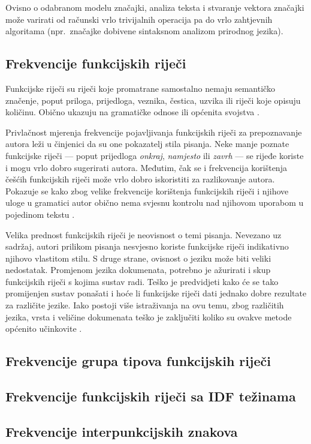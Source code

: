 \documentclass{article}
\begin{document}
Ovisno o odabranom modelu značajki, analiza teksta i stvaranje vektora značajki
može varirati od računski vrlo trivijalnih operacija pa do vrlo zahtjevnih
algoritama (npr.~značajke dobivene sintaksnom analizom prirodnog jezika).


\subsection{Frekvencije funkcijskih riječi}
Funkcijske riječi su riječi koje promatrane samostalno nemaju semantičko
značenje, poput priloga, prijedloga, veznika, čestica, uzvika ili riječi koje
opisuju količinu. Obično ukazuju na gramatičke odnose ili općenita svojstva
\citep{zhao2005effective}.

Privlačnost mjerenja frekvencije pojavljivanja funkcijskih riječi za
prepoznavanje autora leži u činjenici da su one pokazatelj stila pisanja. Neke
manje poznate funkcijske riječi --- poput prijedloga \emph{onkraj},
\emph{namjesto} ili \emph{zavrh} --- se rijeđe koriste i mogu vrlo dobro
sugerirati autora. Međutim, čak se i frekvencija korištenja češćih funkcijskih
riječi može vrlo dobro iskoristiti za razlikovanje autora. Pokazuje se kako zbog
velike frekvencije korištenja funkcijskih riječi i njihove uloge u gramatici
autor obično nema svjesnu kontrolu nad njihovom uporabom u pojedinom tekstu
\citep{argamon2005measuring}.

Velika prednost funkcijskih riječi je neovisnost o temi pisanja. Nevezano uz
sadržaj, autori prilikom pisanja nesvjesno koriste funkcijske riječi indikativno
njihovo vlastitom stilu. S druge strane, ovisnost o jeziku može biti veliki
nedostatak. Promjenom jezika dokumenata, potrebno je ažurirati i skup funkcijskih
riječi s kojima sustav radi. Teško je predvidjeti kako će se tako promijenjen
sustav ponašati i hoće li funkcijske riječi dati jednako dobre rezultate za
različite jezike. Iako postoji više istraživanja na ovu temu, zbog različitih
jezika, vrsta i veličine dokumenata teško je zaključiti koliko su ovakve metode
općenito učinkovite \citep{zhao2005effective}.

\subsection{Frekvencije grupa tipova funkcijskih riječi}
\subsection{Frekvencije funkcijskih riječi sa IDF težinama}
\subsection{Frekvencije interpunkcijskih znakova}
\end{document}
